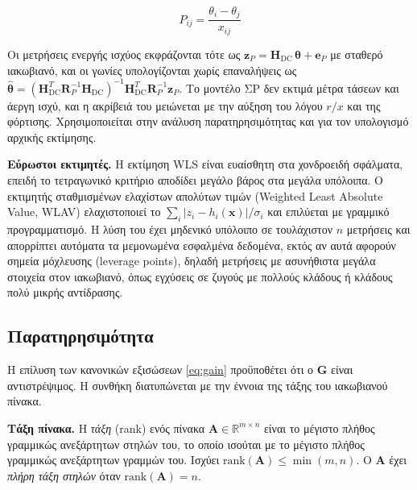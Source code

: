 \begin{equation}
P_{ij} = \frac{\theta_i - \theta_j}{x_{ij}}
\label{eq:dcflow}
\end{equation}

Οι μετρήσεις ενεργής ισχύος εκφράζονται τότε ως $\mathbf{z}_P = \mathbf{H}_{\mathrm{DC}}\,
\boldsymbol{\theta} + \mathbf{e}_P$ με σταθερό ιακωβιανό, και οι γωνίες υπολογίζονται χωρίς
επαναλήψεις ως $\hat{\boldsymbol{\theta}} = (\mathbf{H}_{\mathrm{DC}}^{T}\mathbf{R}_P^{-1}
\mathbf{H}_{\mathrm{DC}})^{-1}\mathbf{H}_{\mathrm{DC}}^{T}\mathbf{R}_P^{-1}\mathbf{z}_P$. Το
μοντέλο ΣΡ δεν εκτιμά μέτρα τάσεων και άεργη ισχύ, και η ακρίβειά του μειώνεται με την αύξηση
του λόγου $r/x$ και της φόρτισης. Χρησιμοποιείται στην ανάλυση παρατηρησιμότητας και για
τον υπολογισμό αρχικής εκτίμησης.

\textbf{Εύρωστοι εκτιμητές.} Η εκτίμηση WLS είναι ευαίσθητη στα χονδροειδή σφάλματα, επειδή
το τετραγωνικό κριτήριο αποδίδει μεγάλο βάρος στα μεγάλα υπόλοιπα. Ο εκτιμητής σταθμισμένων
ελαχίστων απολύτων τιμών (Weighted Least Absolute Value, WLAV) ελαχιστοποιεί το
$\sum_{i} |z_i - h_i(\mathbf{x})|/\sigma_i$ και επιλύεται με γραμμικό προγραμματισμό. Η λύση του έχει μηδενικό υπόλοιπο σε τουλάχιστον $n$ μετρήσεις και απορρίπτει αυτόματα τα μεμονωμένα εσφαλμένα
δεδομένα, εκτός αν αυτά αφορούν σημεία μόχλευσης (leverage points), δηλαδή μετρήσεις με
ασυνήθιστα μεγάλα στοιχεία στον ιακωβιανό, όπως εγχύσεις σε ζυγούς με πολλούς κλάδους ή
κλάδους πολύ μικρής αντίδρασης.

\subsection{Παρατηρησιμότητα}
\label{sec:observability}

Η επίλυση των κανονικών εξισώσεων \eqref{eq:gain} προϋποθέτει ότι ο $\mathbf{G}$ είναι
αντιστρέψιμος. Η συνθήκη διατυπώνεται με την έννοια της τάξης του ιακωβιανού πίνακα.

\textbf{Τάξη πίνακα.} Η \emph{τάξη} (rank) ενός πίνακα $\mathbf{A} \in \mathbb{R}^{m \times n}$
είναι το μέγιστο πλήθος γραμμικώς ανεξάρτητων στηλών του, το οποίο ισούται με το μέγιστο
πλήθος γραμμικώς ανεξάρτητων γραμμών του. Ισχύει $\mathrm{rank}(\mathbf{A}) \le \min(m, n)$. Ο $\mathbf{A}$
έχει \emph{πλήρη τάξη στηλών} όταν $\mathrm{rank}(\mathbf{A}) = n$.

